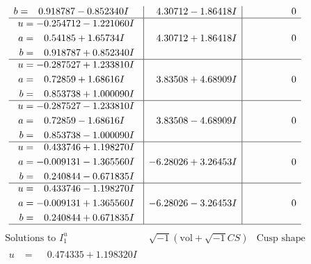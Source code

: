 \documentclass[1p]{elsarticle_modified}
\theoremstyle{definition}
\newcommand{\I}{\sqrt{-1}}
\begin{document}
$$\begin{array}{c|c|c}
\begin{aligned}
b &= \phantom{-}0.918787 - 0.852340 I\end{aligned}
 & \phantom{-}4.30712 - 1.86418 I & \phantom{-0.000000 } 0 \\ \hline\begin{aligned}
u &= -0.254712 - 1.221060 I \\
a &= \phantom{-}0.54185 + 1.65734 I \\
b &= \phantom{-}0.918787 + 0.852340 I\end{aligned}
 & \phantom{-}4.30712 + 1.86418 I & \phantom{-0.000000 } 0 \\ \hline\begin{aligned}
u &= -0.287527 + 1.233810 I \\
a &= \phantom{-}0.72859 + 1.68616 I \\
b &= \phantom{-}0.853738 + 1.000090 I\end{aligned}
 & \phantom{-}3.83508 + 4.68909 I & \phantom{-0.000000 } 0 \\ \hline\begin{aligned}
u &= -0.287527 - 1.233810 I \\
a &= \phantom{-}0.72859 - 1.68616 I \\
b &= \phantom{-}0.853738 - 1.000090 I\end{aligned}
 & \phantom{-}3.83508 - 4.68909 I & \phantom{-0.000000 } 0 \\ \hline\begin{aligned}
u &= \phantom{-}0.433746 + 1.198270 I \\
a &= -0.009131 - 1.365560 I \\
b &= \phantom{-}0.240844 - 0.671835 I\end{aligned}
 & -6.28026 + 3.26453 I & \phantom{-0.000000 } 0 \\ \hline\begin{aligned}
u &= \phantom{-}0.433746 - 1.198270 I \\
a &= -0.009131 + 1.365560 I \\
b &= \phantom{-}0.240844 + 0.671835 I\end{aligned}
 & -6.28026 - 3.26453 I & \phantom{-0.000000 } 0\\
 \hline 
 \end{array}$$\newpage$$\begin{array}{c|c|c}  
\text{Solutions to }I^u_{1}& \I (\text{vol} + \sqrt{-1}CS) & \text{Cusp shape}\\
 \hline 
\begin{aligned}
u &= \phantom{-}0.474335 + 1.198320 I \\

\end{aligned}
\end{array}$$
\end{document}
